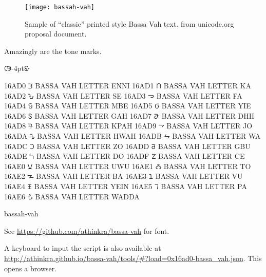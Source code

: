 \begin{figure}[htbp]
\parindent0pt
\centering

\texttt{[image: bassah-vah]}

\caption{Sample of “classic” printed style Bassa Vah text. from unicode.org proposal document.}
\end{figure}

Amazingly are the tone marks.

{
\bassa
𖫪𖫴\kern-4pt𖫫𖫴
}


\bgroup
\obeylines\bassa
16AD0 𖫐 BASSA VAH LETTER ENNI
16AD1 𖫑 BASSA VAH LETTER KA
16AD2 𖫒 BASSA VAH LETTER SE
16AD3 𖫓 BASSA VAH LETTER FA
16AD4 𖫔 BASSA VAH LETTER MBE
16AD5 𖫕 BASSA VAH LETTER YIE
16AD6 𖫖 BASSA VAH LETTER GAH
16AD7 𖫗 BASSA VAH LETTER DHII
16AD8 𖫘 BASSA VAH LETTER KPAH
16AD9 𖫙 BASSA VAH LETTER JO
16ADA 𖫚 BASSA VAH LETTER HWAH
16ADB 𖫛 BASSA VAH LETTER WA
16ADC 𖫜 BASSA VAH LETTER ZO
16ADD 𖫝 BASSA VAH LETTER GBU
16ADE 𖫞 BASSA VAH LETTER DO
16ADF 𖫟 BASSA VAH LETTER CE
16AE0 𖫠 BASSA VAH LETTER UWU
16AE1 𖫡 BASSA VAH LETTER TO
16AE2 𖫢 BASSA VAH LETTER BA
16AE3 𖫣 BASSA VAH LETTER VU
16AE4 𖫤 BASSA VAH LETTER YEIN
16AE5 𖫥 BASSA VAH LETTER PA
16AE6 𖫦 BASSA VAH LETTER WADDA

\egroup
\medskip


\begin{scriptexample}[]{bassah-vah}

See \url{https://github.com/athinkra/bassa-vah} for font.
\end{scriptexample}

A keyboard to input the script is also available at\url{ http://athinkra.github.io/bassa-vah/tools/\#?load=0x16ad0-bassa_vah.json}. This opens  a browser.



